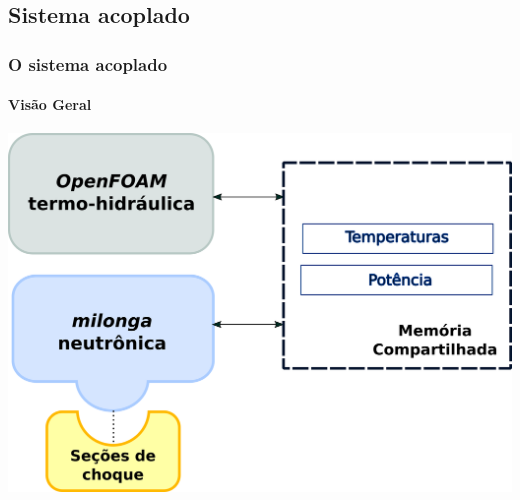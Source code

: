 \documentclass[svgnames,smaller,table]{beamer}
\begin{document}
\subsection{Sistema acoplado}
\begin{frame}
  \frametitle{O sistema acoplado}
  \framesubtitle{Visão Geral}
  \centering\includegraphics[scale=0.5]{../figuras/metodologia2.png}
\end{frame}


%
%
\end{document}
